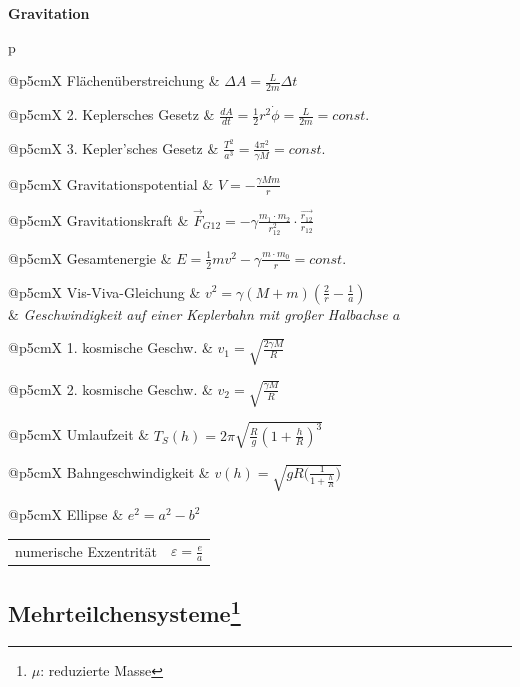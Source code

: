 \documentclass[12pt,a4paper, twoside]{article}
\makeatletter
\renewcommand{\d}[2]{\frac{d #1}{d #2}}
\renewcommand{\=}[1]{\stackrel{#1}{=}}
\theoremstyle{definition}
\theoremstyle{remark}
\newcommand{\concept}[2]{%
\noindent
\begin{framed}
\noindent\textbf{#1}
\par\begin{tabular}{p{\linewidth}}
#2
\end{tabular}
\end{framed}
}
\newcommand{\fnote}[3]{%
\noindent\begin{tabularx}{\linewidth}{@{}p{5cm}X}
#1 & $#2$\\
& \textit{\small{#3}}
\end{tabularx}}
\newcommand{\f}[2]{%
\noindent\begin{tabularx}{\linewidth}{@{}p{5cm}X}
#1 & $#2$
\end{tabularx}}
\makeatother
\begin{document}


\concept{Gravitation}{

\f{Flächenüberstreichung}{\Delta A = \frac{L}{2m} \Delta t}
\f{2. Keplersches Gesetz}{\d{A}{t} = \frac{1}{2} r^2 \dot{\phi} = \frac{L}{2m} = const.}
\f{3. Kepler'sches Gesetz}{\frac{T^2}{a^3} = \frac{4 \pi^2}{\gamma M} = const.}
\f{Gravitationspotential}{V = - \frac{\gamma M m}{r}}
\f{Gravitationskraft}{\vec{F}_{G12} = - \gamma \frac{m_1 \cdot m_2}{r_{12}^2} \cdot \frac{\vec{r_{12}}}{r_{12}}}
\f{Gesamtenergie}{E = \frac{1}{2}mv^2 - \gamma \frac{m \cdot m_0}{r} = const.}
\fnote{Vis-Viva-Gleichung}{v^2 = \gamma (M+m) (\frac{2}{r} - \frac{1}{a})}{Geschwindigkeit auf einer Keplerbahn mit großer Halbachse $a$}
\f{1. kosmische Geschw.}{v_1 = \sqrt{\frac{2 \gamma M}{R}}}
\f{2. kosmische Geschw.}{v_2 = \sqrt{\frac{\gamma M}{R}}}
\f{Umlaufzeit}{T_S(h) = 2 \pi \sqrt{\frac{R}{g}(1+\frac{h}{R})^3}}
\f{Bahngeschwindigkeit}{v(h) = \sqrt{gR \Big(\frac{1}{1+\frac{h}{R}}\Big)}}
\f{Ellipse}{e^2 = a^2-b^2}
\f{numerische Exzentrität}{\varepsilon = \frac{e}{a}}

}


\subsection[Mehrteilchensysteme]{Mehrteilchensysteme\let\thefootnote\relax\footnote{$\mu$: reduzierte Masse}}
\end{document}
